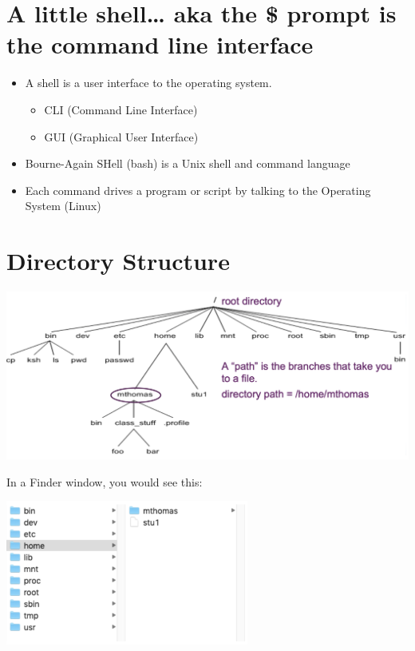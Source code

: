 \documentclass[
]{book}
\providecommand{\tightlist}{%
  \setlength{\itemsep}{0pt}\setlength{\parskip}{0pt}}
\begin{document}
\hypertarget{a-little-shell-aka-the-prompt-is-the-command-line-interface}{%
\section{A little shell\ldots{} aka the \$ prompt is the command line interface}\label{a-little-shell-aka-the-prompt-is-the-command-line-interface}}

\begin{itemize}
\tightlist
\item
  A shell is a user interface to the operating system.

  \begin{itemize}
  \tightlist
  \item
    CLI (Command Line Interface)
  \item
    GUI (Graphical User Interface)
  \end{itemize}
\item
  Bourne-Again SHell (bash) is a Unix shell and command language
\item
  Each command drives a program or script by talking to the Operating System
  (Linux)
\end{itemize}

\hypertarget{directory-structure}{%
\section{Directory Structure}\label{directory-structure}}

\includegraphics[width=1\textwidth,height=\textheight]{./Figures/DirectoryStructure.png}

In a Finder window, you would see this:

\includegraphics[width=0.6\textwidth,height=\textheight]{./Figures/FinderWindow.png}
\end{document}
